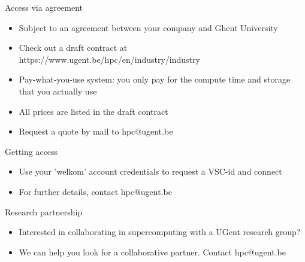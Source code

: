   \item Access via agreement
  \begin{itemize}
    \item Subject to an agreement between your company and Ghent University
    \item Check out a draft contract at https://www.ugent.be/hpc/en/industry/industry
    \item Pay-what-you-use system: you only pay for the compute time and storage that you actually use
    \item All prices are listed in the draft contract
    \item Request a quote by mail to hpc@ugent.be
  \end{itemize}
  \item Getting access
  \begin{itemize}
    \item Use your 'welkom' account credentials to request a VSC-id and connect
    \item For further details, contact hpc@ugent.be
  \end{itemize}
  \item Research partnership
  \begin{itemize}
    \item Interested in collaborating in supercomputing with a UGent research group?
    \item We can help you look for a collaborative partner. Contact hpc@ugent.be
  \end{itemize}

